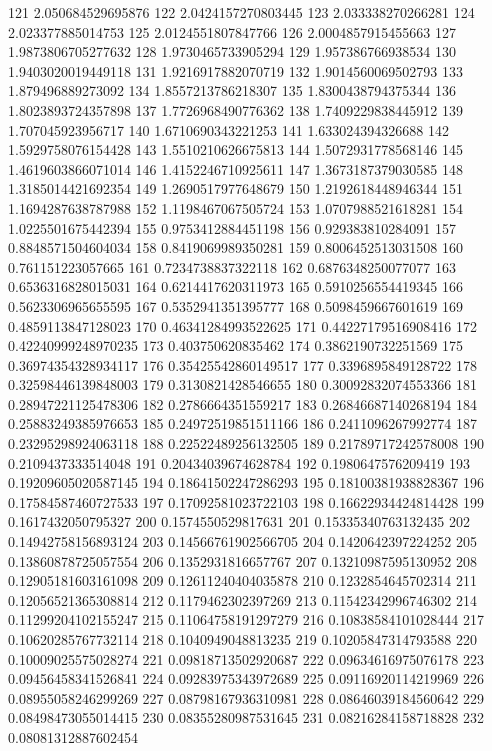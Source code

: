 121 2.050684529695876
122 2.0424157270803445
123 2.033338270266281
124 2.023377885014753
125 2.0124551807847766
126 2.0004857915455663
127 1.9873806705277632
128 1.9730465733905294
129 1.957386766938534
130 1.9403020019449118
131 1.9216917882070719
132 1.9014560069502793
133 1.879496889273092
134 1.8557213786218307
135 1.8300438794375344
136 1.8023893724357898
137 1.7726968490776362
138 1.7409229838445912
139 1.707045923956717
140 1.6710690343221253
141 1.633024394326688
142 1.5929758076154428
143 1.5510210626675813
144 1.5072931778568146
145 1.4619603866071014
146 1.4152246710925611
147 1.3673187379030585
148 1.3185014421692354
149 1.2690517977648679
150 1.2192618448946344
151 1.1694287638787988
152 1.1198467067505724
153 1.0707988521618281
154 1.0225501675442394
155 0.9753412884451198
156 0.929383810284091
157 0.8848571504604034
158 0.8419069989350281
159 0.8006452513031508
160 0.761151223057665
161 0.7234738837322118
162 0.6876348250077077
163 0.6536316828015031
164 0.6214417620311973
165 0.5910256554419345
166 0.5623306965655595
167 0.5352941351395777
168 0.5098459667601619
169 0.4859113847128023
170 0.46341284993522625
171 0.44227179516908416
172 0.42240999248970235
173 0.403750620835462
174 0.3862190732251569
175 0.36974354328934117
176 0.35425542860149517
177 0.3396895849128722
178 0.32598446139848003
179 0.3130821428546655
180 0.30092832074553366
181 0.28947221125478306
182 0.2786664351559217
183 0.26846687140268194
184 0.25883249385976653
185 0.24972519851511166
186 0.2411096267992774
187 0.23295298924063118
188 0.22522489256132505
189 0.21789717242578008
190 0.2109437333514048
191 0.20434039674628784
192 0.1980647576209419
193 0.19209605020587145
194 0.18641502247286293
195 0.18100381938828367
196 0.17584587460727533
197 0.17092581023722103
198 0.16622934424814428
199 0.1617432050795327
200 0.1574550529817631
201 0.15335340763132435
202 0.14942758156893124
203 0.14566761902566705
204 0.1420642397224252
205 0.13860878725057554
206 0.1352931816657767
207 0.13210987595130952
208 0.12905181603161098
209 0.12611240404035878
210 0.1232854645702314
211 0.12056521365308814
212 0.1179462302397269
213 0.11542342996746302
214 0.11299204102155247
215 0.11064758191297279
216 0.10838584101028444
217 0.10620285767732114
218 0.1040949048813235
219 0.10205847314793588
220 0.10009025575028274
221 0.09818713502920687
222 0.09634616975076178
223 0.09456458341526841
224 0.09283975343972689
225 0.09116920114219969
226 0.08955058246299269
227 0.08798167936310981
228 0.08646039184560642
229 0.08498473055014415
230 0.08355280987531645
231 0.08216284158718828
232 0.08081312887602454
